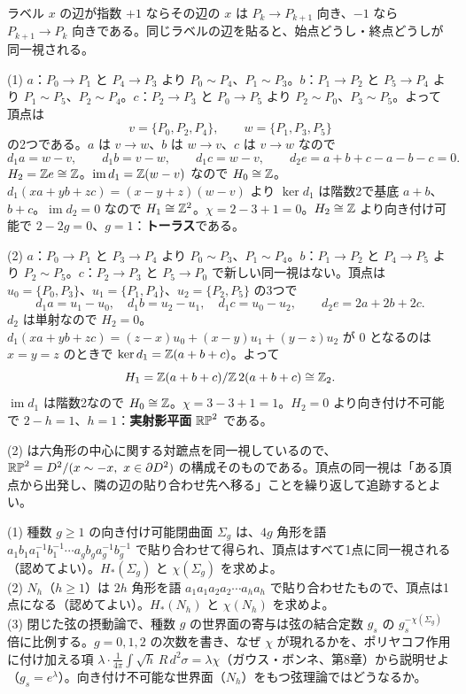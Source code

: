 \begin{solution}
ラベル $x$ の辺が指数 $+1$ ならその辺の $x$ は $P_k\to P_{k+1}$ 向き、$-1$ なら $P_{k+1}\to P_k$ 向きである。同じラベルの辺を貼ると、始点どうし・終点どうしが同一視される。

(1) $a$：$P_0\to P_1$ と $P_4\to P_3$ より $P_0\sim P_4$、$P_1\sim P_3$。$b$：$P_1\to P_2$ と $P_5\to P_4$ より $P_1\sim P_5$、$P_2\sim P_4$。$c$：$P_2\to P_3$ と $P_0\to P_5$ より $P_2\sim P_0$、$P_3\sim P_5$。よって頂点は
\[
v=\{P_0,P_2,P_4\},\qquad w=\{P_1,P_3,P_5\}
\]
の2つである。$a$ は $v\to w$、$b$ は $w\to v$、$c$ は $v\to w$ なので
\[
d_1a=w-v,\qquad d_1b=v-w,\qquad d_1c=w-v,\qquad d_2e=a+b+c-a-b-c=0 .
\]
$H_2=\mathbb{Z} e\cong\mathbb{Z}$。$\operatorname{im}d_1=\mathbb{Z}(w-v)$ なので $H_0\cong\mathbb{Z}$。$d_1(xa+yb+zc)=(x-y+z)(w-v)$ より $\ker d_1$ は階数2で基底 $a+b$、$b+c$。$\operatorname{im}d_2=0$ なので $H_1\cong\mathbb{Z}^2$。$\chi=2-3+1=0$。$H_2\cong\mathbb{Z}$ より向き付け可能で $2-2g=0$、$g=1$：\textbf{トーラス}である。

(2) $a$：$P_0\to P_1$ と $P_3\to P_4$ より $P_0\sim P_3$、$P_1\sim P_4$。$b$：$P_1\to P_2$ と $P_4\to P_5$ より $P_2\sim P_5$。$c$：$P_2\to P_3$ と $P_5\to P_0$ で新しい同一視はない。頂点は $u_0=\{P_0,P_3\}$、$u_1=\{P_1,P_4\}$、$u_2=\{P_2,P_5\}$ の3つで
\[
d_1a=u_1-u_0,\quad d_1b=u_2-u_1,\quad d_1c=u_0-u_2,\qquad d_2e=2a+2b+2c .
\]
$d_2$ は単射なので $H_2=0$。$d_1(xa+yb+zc)=(z-x)u_0+(x-y)u_1+(y-z)u_2$ が $0$ となるのは $x=y=z$ のときで $\ker d_1=\mathbb{Z}(a+b+c)$。よって
\[
H_1=\mathbb{Z}(a+b+c)/\mathbb{Z}\,2(a+b+c)\cong\mathbb{Z}_2 .
\]
$\operatorname{im}d_1$ は階数2なので $H_0\cong\mathbb{Z}$。$\chi=3-3+1=1$。$H_2=0$ より向き付け不可能で $2-h=1$、$h=1$：\textbf{実射影平面} $\mathbb{RP}^2$ である。

\begin{note}
(2) は六角形の中心に関する対蹠点を同一視しているので、$\mathbb{RP}^2=D^2/(x\sim-x,\ x\in\partial D^2)$ の構成そのものである。頂点の同一視は「ある頂点から出発し、隣の辺の貼り合わせ先へ移る」ことを繰り返して追跡するとよい。
\end{note}
\end{solution}

\begin{problem}[難易度 B]\label{ch04-prob-genus}
(1) 種数 $g\ge1$ の向き付け可能閉曲面 $\Sigma_g$ は、$4g$ 角形を語 $a_1b_1a_1^{-1}b_1^{-1}\cdots a_gb_ga_g^{-1}b_g^{-1}$ で貼り合わせて得られ、頂点はすべて1点に同一視される（認めてよい）。$H_*(\Sigma_g)$ と $\chi(\Sigma_g)$ を求めよ。\\
(2) $N_h$（$h\ge1$）は $2h$ 角形を語 $a_1a_1a_2a_2\cdots a_ha_h$ で貼り合わせたもので、頂点は1点になる（認めてよい）。$H_*(N_h)$ と $\chi(N_h)$ を求めよ。\\
(3) 閉じた弦の摂動論で、種数 $g$ の世界面の寄与は弦の結合定数 $g_s$ の $g_s^{-\chi(\Sigma_g)}$ 倍に比例する。$g=0,1,2$ の次数を書き、なぜ $\chi$ が現れるかを、ポリヤコフ作用に付け加える項 $\lambda\cdot\frac1{4\pi}\int\sqrt{h}\,R\,d^2\sigma=\lambda\chi$（ガウス・ボンネ、第8章）から説明せよ（$g_s=e^\lambda$）。向き付け不可能な世界面（$N_h$）をもつ弦理論ではどうなるか。
\end{problem}

